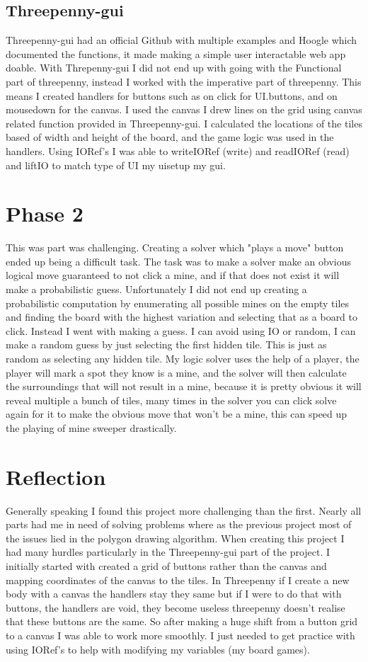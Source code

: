\documentclass{article} %
\begin{document}
\subsection{Threepenny-gui}
Threepenny-gui had an official Github with multiple examples and Hoogle which documented the functions, it made making a simple 
user interactable web app doable. With Threpenny-gui I did not end up with going with the Functional part of threepenny, instead I worked with the
imperative part of threepenny. This means I created handlers for buttons such as on click for UI.buttons, and on mousedown for the canvas.
I used the canvas I drew lines on the grid using canvas related function provided in Threepenny-gui. I calculated the locations of the tiles
based of width and height of the board, and the game logic was used in the handlers. Using IORef's I was able to writeIORef (write) and readIORef (read)
and liftIO to match type of UI my uisetup my gui.

\section{Phase 2}
This was part was challenging. Creating a solver which "plays a move" button ended up being a difficult task. The task was to make a solver make an obvious
logical move guaranteed to not click a mine, and if that does not exist it will make a probabilistic guess. Unfortunately I did not end up creating a 
probabilistic computation by enumerating all possible mines on the empty tiles and finding the board with the highest variation and selecting that as a
board to click. Instead I went with making a guess. I can avoid using IO or random, I can make a random guess by just selecting the first hidden tile.
This is just as random as selecting any hidden tile. My logic solver uses the help of a player, the player will mark a spot they know is a mine, and the solver
will then calculate the surroundings that will not result in a mine, because it is pretty obvious it will reveal multiple a bunch of tiles, many times in 
the solver you can click solve again for it to make the obvious move that won't be a mine, this can speed up the playing of mine sweeper drastically.

\section{Reflection}
Generally speaking I found this project more challenging than the first. Nearly all parts had me in need of solving problems where as the previous
project most of the issues lied in the polygon drawing algorithm. When creating this project I had many hurdles particularly in the Threepenny-gui
part of the project. I initially started with created a grid of buttons rather than the canvas and mapping coordinates of the canvas to the tiles.
In Threepenny if I create a new body with a canvas the handlers stay they same but if I were to do that with buttons, the handlers are void, they 
become useless threepenny doesn't realise that these buttons are the same. So after making a huge shift from a button grid to a canvas I was able
to work more smoothly. I just needed to get practice with using IORef's to help with modifying my variables (my board games). 
\end{document}
